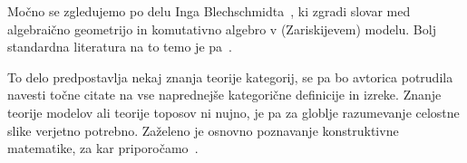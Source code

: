 


Močno se zgledujemo po delu Inga
Blechschmidta~\cite{Blechschmidt17,Blechschmidt22}, ki zgradi slovar med
algebraično geometrijo in komutativno algebro v (Zariskijevem) modelu. Bolj
standardna literatura na to temo je pa~\cite{MM92,Johnstone02}.

To delo predpostavlja nekaj znanja teorije kategorij, se pa bo avtorica
potrudila navesti točne citate na vse naprednejše kategorične definicije in
izreke. Znanje teorije modelov ali teorije toposov ni nujno, je pa za globlje
razumevanje celostne slike verjetno potrebno. Zaželeno je osnovno poznavanje
konstruktivne matematike, za kar priporočamo~\cite{Bauer16, Bishop85}.

